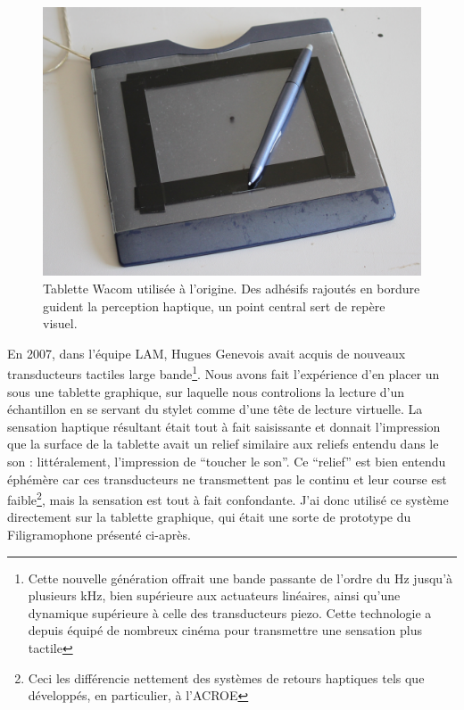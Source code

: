 \begin{figure}[!htbp]
	\captionsetup{format=plain}%
	\includegraphics[width=\textwidth]{gfx/05_interfaces/wacom.jpg}
	\caption[Tablette wacom]{Tablette Wacom utilisée à l'origine. Des adhésifs rajoutés en bordure guident la perception haptique, un point central sert de repère visuel.}
	\label{fig:interface:wacom}
\end{figure}
\indent En 2007, dans l'équipe \gls{LAM}, Hugues Genevois avait acquis de nouveaux transducteurs tactiles large bande\footnote{Cette nouvelle génération offrait une bande passante de l'ordre du Hz jusqu'à plusieurs kHz, bien supérieure aux actuateurs linéaires, ainsi qu'une dynamique supérieure à celle des transducteurs piezo. Cette technologie a depuis équipé de nombreux cinéma pour transmettre une sensation plus tactile}. Nous avons fait l'expérience d'en placer un sous une tablette graphique, sur laquelle nous controlions la lecture d'un échantillon en se servant du stylet comme d'une tête de lecture virtuelle. La sensation haptique résultant était tout à fait saisissante et donnait l'impression que la surface de la tablette avait un relief similaire aux reliefs entendu dans le son : littéralement, l'impression de ``toucher le son''. Ce ``relief'' est bien entendu éphémère car ces transducteurs ne transmettent pas le continu et leur course est faible\footnote{Ceci les différencie nettement des systèmes de retours haptiques tels que développés, en particulier, à l'\gls{ACROE}}, mais la sensation est tout à fait confondante. J'ai donc utilisé ce système directement sur la tablette graphique, qui était une sorte de prototype du Filigramophone présenté ci-après.

